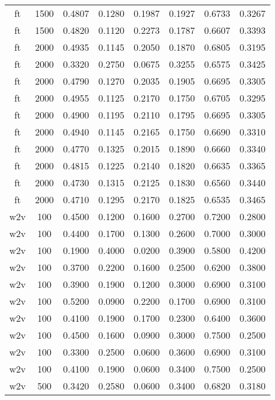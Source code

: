 \begin{scriptsize}
\begin{longtable}{cccccccc}
		ft       & 1500 & 0.4807 & 0.1280 & 0.1987 & 0.1927 & 0.6733 & 0.3267 \\
		ft       & 1500 & 0.4820 & 0.1120 & 0.2273 & 0.1787 & 0.6607 & 0.3393 \\
		ft       & 2000 & 0.4935 & 0.1145 & 0.2050 & 0.1870 & 0.6805 & 0.3195 \\
		ft       & 2000 & 0.3320 & 0.2750 & 0.0675 & 0.3255 & 0.6575 & 0.3425 \\
		ft       & 2000 & 0.4790 & 0.1270 & 0.2035 & 0.1905 & 0.6695 & 0.3305 \\
		ft       & 2000 & 0.4955 & 0.1125 & 0.2170 & 0.1750 & 0.6705 & 0.3295 \\
		ft       & 2000 & 0.4900 & 0.1195 & 0.2110 & 0.1795 & 0.6695 & 0.3305 \\
		ft       & 2000 & 0.4940 & 0.1145 & 0.2165 & 0.1750 & 0.6690 & 0.3310 \\
		ft       & 2000 & 0.4770 & 0.1325 & 0.2015 & 0.1890 & 0.6660 & 0.3340 \\
		ft       & 2000 & 0.4815 & 0.1225 & 0.2140 & 0.1820 & 0.6635 & 0.3365 \\
		ft       & 2000 & 0.4730 & 0.1315 & 0.2125 & 0.1830 & 0.6560 & 0.3440 \\
		ft       & 2000 & 0.4710 & 0.1295 & 0.2170 & 0.1825 & 0.6535 & 0.3465 \\
		w2v      & 100  & 0.4500 & 0.1200 & 0.1600 & 0.2700 & 0.7200 & 0.2800 \\
		w2v      & 100  & 0.4400 & 0.1700 & 0.1300 & 0.2600 & 0.7000 & 0.3000 \\
		w2v      & 100  & 0.1900 & 0.4000 & 0.0200 & 0.3900 & 0.5800 & 0.4200 \\
		w2v      & 100  & 0.3700 & 0.2200 & 0.1600 & 0.2500 & 0.6200 & 0.3800 \\
		w2v      & 100  & 0.3900 & 0.1900 & 0.1200 & 0.3000 & 0.6900 & 0.3100 \\
		w2v      & 100  & 0.5200 & 0.0900 & 0.2200 & 0.1700 & 0.6900 & 0.3100 \\
		w2v      & 100  & 0.4100 & 0.1900 & 0.1700 & 0.2300 & 0.6400 & 0.3600 \\
		w2v      & 100  & 0.4500 & 0.1600 & 0.0900 & 0.3000 & 0.7500 & 0.2500 \\
		w2v      & 100  & 0.3300 & 0.2500 & 0.0600 & 0.3600 & 0.6900 & 0.3100 \\
		w2v      & 100  & 0.4100 & 0.1900 & 0.0600 & 0.3400 & 0.7500 & 0.2500 \\
		w2v      & 500  & 0.3420 & 0.2580 & 0.0600 & 0.3400 & 0.6820 & 0.3180 \\

\end{longtable}
\end{scriptsize}
